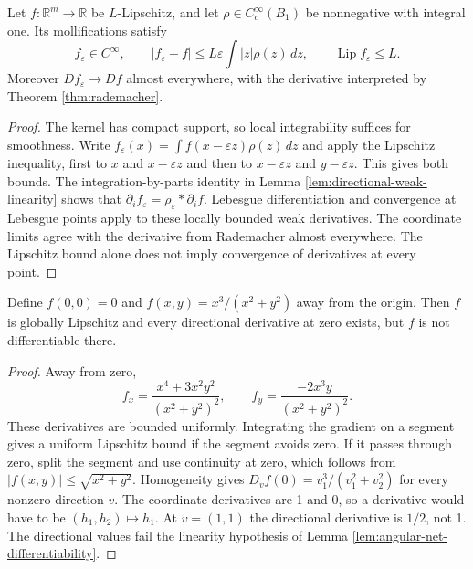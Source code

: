 \begin{proposition}\label{prop:lipschitz-mollification}
Let $f:\mathbb R^m\to\mathbb R$ be $L$-Lipschitz, and let $\rho\in C_c^\infty(B_1)$ be nonnegative with integral one. Its mollifications satisfy
\[
 f_\varepsilon\in C^\infty,\qquad
 |f_\varepsilon-f|\leq L\varepsilon\int |z|\rho(z)\,dz,
 \qquad \operatorname{Lip}f_\varepsilon\leq L.
\]
Moreover $Df_\varepsilon\to Df$ almost everywhere, with the derivative interpreted by Theorem \ref{thm:rademacher}.
\end{proposition}
\begin{proof}
The kernel has compact support, so local integrability suffices for smoothness. Write $f_\varepsilon(x)=\int f(x-\varepsilon z)\rho(z)\,dz$ and apply the Lipschitz inequality, first to $x$ and $x-\varepsilon z$ and then to $x-\varepsilon z$ and $y-\varepsilon z$. This gives both bounds. The integration-by-parts identity in Lemma \ref{lem:directional-weak-linearity} shows that $\partial_i f_\varepsilon=\rho_\varepsilon*\partial_i f$. Lebesgue differentiation and convergence at Lebesgue points apply to these locally bounded weak derivatives. The coordinate limits agree with the derivative from Rademacher almost everywhere. The Lipschitz bound alone does not imply convergence of derivatives at every point.
\end{proof}

\begin{example}\label{ex:directional-not-differentiable}
Define $f(0,0)=0$ and $f(x,y)=x^3/(x^2+y^2)$ away from the origin. Then $f$ is globally Lipschitz and every directional derivative at zero exists, but $f$ is not differentiable there.
\end{example}
\begin{proof}
Away from zero,
\[
 f_x=\frac{x^4+3x^2y^2}{(x^2+y^2)^2},\qquad
 f_y=\frac{-2x^3y}{(x^2+y^2)^2}.
\]
These derivatives are bounded uniformly. Integrating the gradient on a segment gives a uniform Lipschitz bound if the segment avoids zero. If it passes through zero, split the segment and use continuity at zero, which follows from $|f(x,y)|\leq\sqrt{x^2+y^2}$. Homogeneity gives $D_vf(0)=v_1^3/(v_1^2+v_2^2)$ for every nonzero direction $v$. The coordinate derivatives are 1 and 0, so a derivative would have to be $(h_1,h_2)\mapsto h_1$. At $v=(1,1)$ the directional derivative is $1/2$, not 1. The directional values fail the linearity hypothesis of Lemma \ref{lem:angular-net-differentiability}.
\end{proof}
